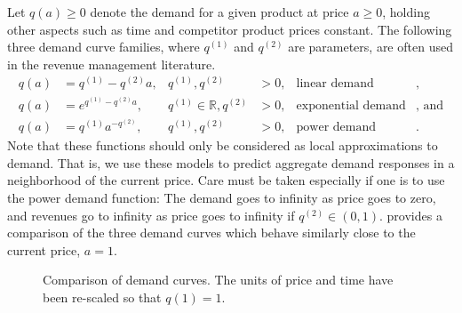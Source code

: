 \documentclass[main.tex]{subfiles}
\begin{document}
Let $q(a)\geq 0$ denote the demand for a given product at price $a\geq 0$, holding
other aspects such as time and competitor product prices constant.
The following three demand curve families, where $q^{(1)}$ and
$q^{(2)}$ are parameters, are often used in the
revenue management literature.
\begin{align}\label{eq:demand_fun_lin}
  q(a) &= q^{(1)}-q^{(2)}a,&q^{(1)},q^{(2)}&>0,&\text{linear demand}&,\\
  q(a) &= e^{q^{(1)}-q^{(2)}a},&q^{(1)}\in\mathbb{R},q^{(2)}&>0,&\text{exponential
                                                                  demand}&\text{, and}\\
  q(a) &= q^{(1)}a^{-q^{(2)}},&q^{(1)},q^{(2)}&>0,&\text{power demand}&.\label{eq:demand_fun_pow}
\end{align}
Note that these functions should only be considered as local
approximations to demand. That is, we use these models to predict
aggregate demand responses in a neighborhood of the current
price. Care must be taken especially if one is to use the power demand
function: The demand goes to infinity as price goes to zero, and
revenues go to infinity as price goes to infinity if $q^{(2)}\in(0,1)$.
 provides a comparison of the three
demand curves which behave similarly close to the
current price, $a=1$.
\begin{figure}[htbp]
  \centering
  \caption[Comparison of demand curves]{Comparison of demand curves. The units of price and time
    have been re-scaled so that $q(1)=1$.}\label{fig:demandfun_comparison}
\end{figure}
\end{document}
